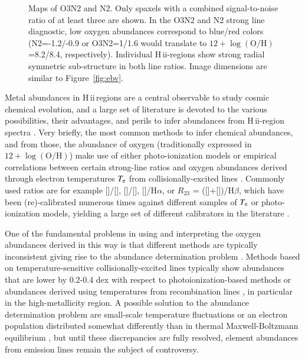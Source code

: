 \documentclass[traditabstract]{aa}
\newcommand{\hb}{H$\beta$}
\newcommand{\ha}{H$\alpha$}
\newcommand{\hii}{\mbox{H\,{\sc ii}}}
\newcommand{\oh}{$12+\log(\mathrm{O/H})$}
\newcommand{\oii}{[\ion{O}{ii}]}
\newcommand{\oiii}{[\ion{O}{iii}]}
\newcommand{\nii}{[\ion{N}{ii}]}
\begin{document}
\begin{figure}
\begin{subfigure}{.24\textwidth}
\end{subfigure}
\caption{Maps of O3N2 and N2. Only spaxels with a combined signal-to-noise ratio of at least three are shown. In the O3N2 and N2 strong line diagnostic, low oxygen abundances correspond to blue/red colors (N2=-1.2/-0.9 or  O3N2=1/1.6 would translate to \oh=8.2/8.4, respectively). Individual \hii-regions show strong radial symmetric sub-structure in both line ratios. Image dimensions are similar to Figure~\ref{fig:ebv}.}
\label{fig:o3n2}
\end{figure}

Metal abundances in \hii\,regions are a central observable to study cosmic chemical evolution, and a large set of literature is devoted to the various possibilities, their advantages, and perils to infer abundances from \hii-region spectra  \citep[e.g.,][]{1979MNRAS.189...95P, 1991ApJ...380..140M, 2005ApJ...631..231P, 2008ApJ...681.1183K}. Very briefly, the most common methods to infer chemical abundances, and from those, the abundance of oxygen (traditionally expressed in \oh) make use of either photo-ionization models \citep[e.g.,][]{1985ApJS...58..125E, 2000ApJ...542..224D, 2002ApJS..142...35K} or empirical correlations between certain strong-line ratios and oxygen abundances derived through electron temperatures $T_{\rm{e}}$ from collisionally-excited lines \citep[CELs, e.g.,][]{2004MNRAS.348L..59P, 2013A&A...559A.114M}. Commonly used ratios are for example \nii/\oii, \oiii/\nii, \nii/\ha, or $R_{23}$ = (\oii+\oiii)/\hb, which have been (re)-calibrated numerous times against different samples of $T_{\rm{e}}$ or photo-ionization models, yielding a large set of different calibrators in the literature \citep[e.g.,][]{2002ApJS..142...35K, 2004ApJ...617..240K, 2005ApJ...631..231P, 2006A&A...459...85N, 2008A&A...488..463M}.

One of the fundamental problems in using and interpreting the oxygen abundances derived in this way is that different methods are typically inconsistent \citep[e.g.,][]{2008ApJ...681.1183K} giving rise to the abundance determination problem \citep{1967ApJ...150..825P}. Methods based on temperature-sensitive collisionally-excited lines typically show abundances that are lower by 0.2-0.4 dex with respect to photoionization-based methods or abundances derived using temperatures from recombination lines \citep[e.g.,][and references therein]{2012MNRAS.426.2630L}, in particular in the high-metallicity region. A possible solution to the abundance determination problem are small-scale temperature fluctuations \citep[e.g.,][]{2003ApJ...584..735P, 2004MNRAS.355..229E} or an electron population distributed somewhat differently than in thermal Maxwell-Boltzmann equilibrium \citep{2012ApJ...752..148N, 2012MNRAS.426.2630L}, but until these discrepancies are fully resolved, element abundances from emission lines remain the subject of controversy.
\end{document}

